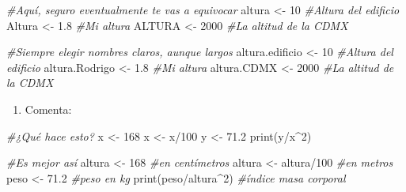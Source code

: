 \documentclass[
]{book}
\newenvironment{Shaded}{\begin{snugshade}}{\end{snugshade}}
\newcommand{\CommentTok}[1]{\textcolor[rgb]{0.56,0.35,0.01}{\textit{#1}}}
\newcommand{\DecValTok}[1]{\textcolor[rgb]{0.00,0.00,0.81}{#1}}
\newcommand{\FloatTok}[1]{\textcolor[rgb]{0.00,0.00,0.81}{#1}}
\newcommand{\FunctionTok}[1]{\textcolor[rgb]{0.00,0.00,0.00}{#1}}
\newcommand{\NormalTok}[1]{#1}
\newcommand{\OtherTok}[1]{\textcolor[rgb]{0.56,0.35,0.01}{#1}}
\newcommand{\SpecialCharTok}[1]{\textcolor[rgb]{0.00,0.00,0.00}{#1}}
\providecommand{\tightlist}{%
  \setlength{\itemsep}{0pt}\setlength{\parskip}{0pt}}
\begin{document}
\begin{Shaded}
\begin{Highlighting}[]
\CommentTok{\#Aquí, seguro eventualmente te vas a equivocar}
\NormalTok{altura }\OtherTok{\textless{}{-}} \DecValTok{10}   \CommentTok{\#Altura del edificio}
\NormalTok{Altura }\OtherTok{\textless{}{-}} \FloatTok{1.8}  \CommentTok{\#Mi altura}
\NormalTok{ALTURA }\OtherTok{\textless{}{-}} \DecValTok{2000} \CommentTok{\#La altitud de la CDMX}

\CommentTok{\#Siempre elegir nombres claros, aunque largos}
\NormalTok{altura.edificio }\OtherTok{\textless{}{-}} \DecValTok{10}   \CommentTok{\#Altura del edificio}
\NormalTok{altura.Rodrigo  }\OtherTok{\textless{}{-}} \FloatTok{1.8}  \CommentTok{\#Mi altura}
\NormalTok{altura.CDMX     }\OtherTok{\textless{}{-}} \DecValTok{2000} \CommentTok{\#La altitud de la CDMX}
\end{Highlighting}
\end{Shaded}

\begin{enumerate}
\def\labelenumi{\arabic{enumi}.}
\setcounter{enumi}{5}
\tightlist
\item
  Comenta:
\end{enumerate}

\begin{Shaded}
\begin{Highlighting}[]
\CommentTok{\#¿Qué hace esto?}
\NormalTok{x }\OtherTok{\textless{}{-}} \DecValTok{168}
\NormalTok{x }\OtherTok{\textless{}{-}}\NormalTok{ x}\SpecialCharTok{/}\DecValTok{100}
\NormalTok{y }\OtherTok{\textless{}{-}} \FloatTok{71.2}
\FunctionTok{print}\NormalTok{(y}\SpecialCharTok{/}\NormalTok{x}\SpecialCharTok{\^{}}\DecValTok{2}\NormalTok{) }
  
\CommentTok{\#Es mejor así}
\NormalTok{altura }\OtherTok{\textless{}{-}} \DecValTok{168}        \CommentTok{\#en centímetros}
\NormalTok{altura }\OtherTok{\textless{}{-}}\NormalTok{ altura}\SpecialCharTok{/}\DecValTok{100} \CommentTok{\#en metros}
\NormalTok{peso   }\OtherTok{\textless{}{-}} \FloatTok{71.2}       \CommentTok{\#peso en kg}
\FunctionTok{print}\NormalTok{(peso}\SpecialCharTok{/}\NormalTok{altura}\SpecialCharTok{\^{}}\DecValTok{2}\NormalTok{) }\CommentTok{\#índice masa corporal}
\end{Highlighting}
\end{Shaded}
\end{document}
